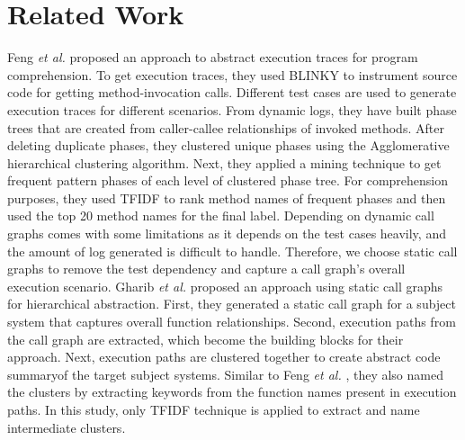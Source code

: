 \section{Related Work}
\label{relatedwork}
Feng \textit{et al.} \cite{feng2018dynamic} proposed an approach to abstract execution traces for program comprehension. To get execution traces, they used BLINKY to instrument source code for getting method-invocation calls. Different test cases are used to generate execution traces for different scenarios. From dynamic logs, they have built phase trees that are created from caller-callee relationships of invoked methods. After deleting duplicate phases, they clustered unique phases using the Agglomerative hierarchical clustering algorithm. Next, they applied a mining technique to get frequent pattern phases of each level of clustered phase tree. For comprehension purposes, they used TFIDF to rank method names of frequent phases and then used the top 20 method names for the final label. Depending on dynamic call graphs comes with some limitations as it depends on the test cases heavily, and the amount of log generated is difficult to handle. Therefore, we choose static call graphs to remove the test dependency and capture a call graph's overall execution scenario. Gharib \textit{et al.}  \cite{gharibi2018automatic} proposed an approach using static call graphs for hierarchical abstraction. First, they generated a static call graph for a subject system that captures overall function relationships. Second, execution paths from the call graph are extracted, which become the building blocks for their approach. Next, execution paths are clustered together to create abstract code summaryof the target subject systems. Similar to Feng \textit{et al.}  \cite{feng2018dynamic}, they also named the clusters by extracting keywords from the function names present in execution paths. In this study, only TFIDF technique is applied to extract and name intermediate clusters.

